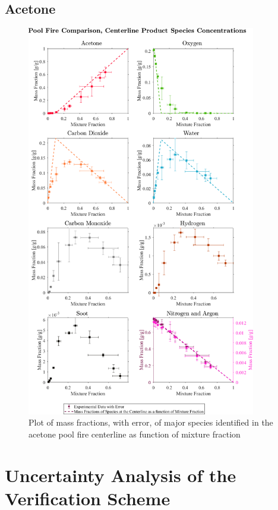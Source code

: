 \documentclass[12pt]{article}
\begin{document}
\subsection{Acetone}
\label{ssec:Acetone_ALL_Mix_Frac}
\begin{figure}[!h]
	\centering
\includegraphics[width=10.0cm,keepaspectratio]{Acetone_Mixture_Fraction_Major_Plot.png}
	\caption[Plot of mass fractions, with error, of major species identified in the acetone pool fire centerline as function of mixture fraction]{Plot of mass fractions, with error, of major species identified in the acetone pool fire centerline as function of mixture fraction}
	\label{fig:Acetone_MIX_Frac_Major}
\end{figure}

\pagebreak

\section{Uncertainty Analysis of the Verification Scheme}\label{sec:Uncertainty_Ver_Scheme}
\end{document}
